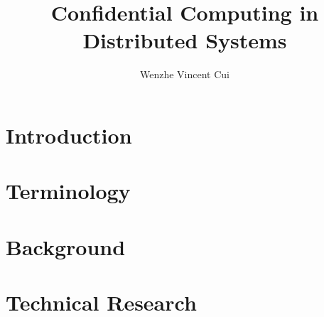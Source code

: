 \documentclass[oneside, english, draft]{sdqthesis}
\author{Wenzhe Vincent Cui}
\title{Confidential Computing in Distributed Systems}
\begin{document}
\setpdf

\maketitle

\frontmatter



\setcounter{page}{1}


\listoftodos
 



\tableofcontents

\listoffigures
\listoftables


\mainmatter

\chapter{Introduction}
\label{ch:Introduction}



\chapter{Terminology}



\chapter{Background}




\chapter{Technical Research}
\end{document}
